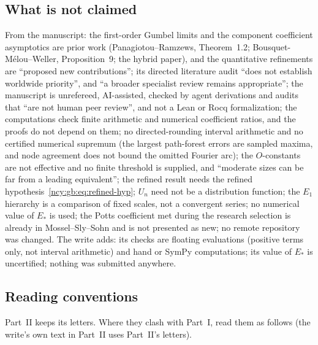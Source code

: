 \documentclass[11pt,letterpaper]{article}
\numberwithin{equation}{section}
\theoremstyle{remark}\newtheorem{remark}[theorem]{Remark}
\theoremstyle{definition}\newtheorem{definition}[theorem]{Definition}\theoremstyle{plain}
\begin{document}
\subsection{What is not claimed}\label{ncy:gb:sec:nonclaims}

From the manuscript: the first-order Gumbel limits and the component
coefficient asymptotics are prior work (Panagiotou--Ramzews, Theorem~1.2;
Bousquet-M\'elou--Weller, Proposition~9; the hybrid paper), and the
quantitative refinements are ``proposed new contributions''; its directed
literature audit ``does not establish worldwide priority'', and ``a broader
specialist review remains appropriate''; the manuscript is unrefereed,
AI-assisted, checked by agent derivations and audits that ``are not human
peer review'', and not a Lean or Rocq formalization; the computations check
finite arithmetic and numerical coefficient ratios, and the proofs do not
depend on them; no directed-rounding interval arithmetic and no certified
numerical supremum (the largest path-forest errors are sampled maxima, and
node agreement does not bound the omitted Fourier arc); the $O$-constants are
not effective and no finite threshold is supplied, and ``moderate sizes can
be far from a leading equivalent''; the refined result needs the refined
hypothesis~\eqref{ncy:gb:eq:refined-hyp}; $U_n$ need not be a distribution
function; the $E_1$ hierarchy is a comparison of fixed scales, not a
convergent series; no numerical value of $E_*$ is used; the Potts
coefficient met during the research selection is already in
Mossel--Sly--Sohn and is not presented as new; no remote repository was
changed. The write adds: its checks are floating evaluations (positive terms
only, not interval arithmetic) and hand or SymPy computations; its value of
$E_*$ is uncertified; nothing was submitted anywhere.

\subsection{Reading conventions}\label{ncy:gb:sec:notation}

Part~II keeps its letters. Where they clash with Part~I, read them as follows
(the write's own text in Part~II uses Part~II's letters).
\end{document}
